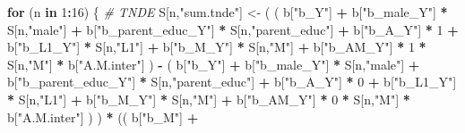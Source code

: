 \documentclass[
]{book}
\newenvironment{Shaded}{\begin{snugshade}}{\end{snugshade}}
\newcommand{\CommentTok}[1]{\textcolor[rgb]{0.56,0.35,0.01}{\textit{#1}}}
\newcommand{\ControlFlowTok}[1]{\textcolor[rgb]{0.13,0.29,0.53}{\textbf{#1}}}
\newcommand{\DecValTok}[1]{\textcolor[rgb]{0.00,0.00,0.81}{#1}}
\newcommand{\NormalTok}[1]{#1}
\newcommand{\OtherTok}[1]{\textcolor[rgb]{0.56,0.35,0.01}{#1}}
\newcommand{\SpecialCharTok}[1]{\textcolor[rgb]{0.81,0.36,0.00}{\textbf{#1}}}
\newcommand{\StringTok}[1]{\textcolor[rgb]{0.31,0.60,0.02}{#1}}
\begin{document}
\begin{Shaded}
\begin{Highlighting}[]
  \ControlFlowTok{for}\NormalTok{ (n }\ControlFlowTok{in} \DecValTok{1}\SpecialCharTok{:}\DecValTok{16}\NormalTok{) \{}
    \CommentTok{\# TNDE }
\NormalTok{    S[n,}\StringTok{"sum.tnde"}\NormalTok{] }\OtherTok{\textless{}{-}}\NormalTok{ ( ( b[}\StringTok{"b\_Y"}\NormalTok{] }\SpecialCharTok{+} 
\NormalTok{                             b[}\StringTok{"b\_male\_Y"}\NormalTok{] }\SpecialCharTok{*}\NormalTok{ S[n,}\StringTok{"male"}\NormalTok{] }\SpecialCharTok{+} 
\NormalTok{                             b[}\StringTok{"b\_parent\_educ\_Y"}\NormalTok{] }\SpecialCharTok{*}\NormalTok{ S[n,}\StringTok{"parent\_educ"}\NormalTok{] }\SpecialCharTok{+} 
\NormalTok{                             b[}\StringTok{"b\_A\_Y"}\NormalTok{] }\SpecialCharTok{*} \DecValTok{1} \SpecialCharTok{+} 
\NormalTok{                             b[}\StringTok{"b\_L1\_Y"}\NormalTok{] }\SpecialCharTok{*}\NormalTok{ S[n,}\StringTok{"L1"}\NormalTok{] }\SpecialCharTok{+}
\NormalTok{                             b[}\StringTok{"b\_M\_Y"}\NormalTok{] }\SpecialCharTok{*}\NormalTok{ S[n,}\StringTok{"M"}\NormalTok{] }\SpecialCharTok{+}
\NormalTok{                             b[}\StringTok{"b\_AM\_Y"}\NormalTok{] }\SpecialCharTok{*} \DecValTok{1} \SpecialCharTok{*}\NormalTok{ S[n,}\StringTok{"M"}\NormalTok{] }\SpecialCharTok{*}\NormalTok{ b[}\StringTok{"A.M.inter"}\NormalTok{] ) }\SpecialCharTok{{-}} 
\NormalTok{                           ( b[}\StringTok{"b\_Y"}\NormalTok{] }\SpecialCharTok{+} 
\NormalTok{                               b[}\StringTok{"b\_male\_Y"}\NormalTok{] }\SpecialCharTok{*}\NormalTok{ S[n,}\StringTok{"male"}\NormalTok{] }\SpecialCharTok{+} 
\NormalTok{                               b[}\StringTok{"b\_parent\_educ\_Y"}\NormalTok{] }\SpecialCharTok{*}\NormalTok{ S[n,}\StringTok{"parent\_educ"}\NormalTok{] }\SpecialCharTok{+} 
\NormalTok{                               b[}\StringTok{"b\_A\_Y"}\NormalTok{] }\SpecialCharTok{*} \DecValTok{0} \SpecialCharTok{+} 
\NormalTok{                               b[}\StringTok{"b\_L1\_Y"}\NormalTok{] }\SpecialCharTok{*}\NormalTok{ S[n,}\StringTok{"L1"}\NormalTok{] }\SpecialCharTok{+}
\NormalTok{                               b[}\StringTok{"b\_M\_Y"}\NormalTok{] }\SpecialCharTok{*}\NormalTok{ S[n,}\StringTok{"M"}\NormalTok{] }\SpecialCharTok{+} 
\NormalTok{                               b[}\StringTok{"b\_AM\_Y"}\NormalTok{] }\SpecialCharTok{*} \DecValTok{0} \SpecialCharTok{*}\NormalTok{ S[n,}\StringTok{"M"}\NormalTok{] }\SpecialCharTok{*}\NormalTok{ b[}\StringTok{"A.M.inter"}\NormalTok{] ) ) }\SpecialCharTok{*}
\NormalTok{      (( b[}\StringTok{"b\_M"}\NormalTok{] }\SpecialCharTok{+} 

\end{Highlighting}
\end{Shaded}
\end{document}
